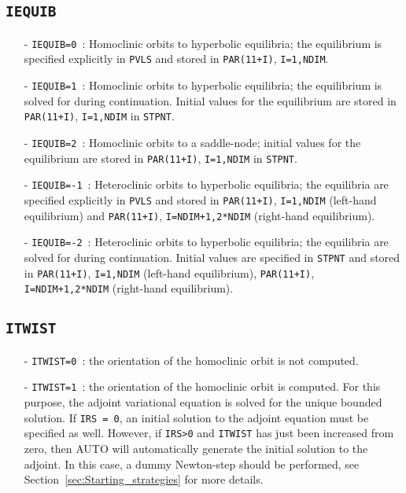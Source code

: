 \documentclass[12pt]{report}
\begin{document}
\subsection{\tt IEQUIB}  \label{sec:IEQUIB}
\begin{itemize}
\item[-] {\tt IEQUIB=0}~: 
Homoclinic orbits to hyperbolic equilibria;  
the equilibrium is specified explicitly in {\tt PVLS} and stored in
{\tt PAR(11+I)}, {\tt I=1,NDIM}.
\item[-] {\tt IEQUIB=1}~: 
Homoclinic orbits to hyperbolic equilibria;  
the equilibrium is solved for during continuation. Initial values for
the equilibrium are stored in {\tt PAR(11+I)}, {\tt I=1,NDIM} in {\tt STPNT}.
\item[-] {\tt IEQUIB=2}~: 
Homoclinic orbits to a saddle-node; initial values for
the equilibrium are stored in {\tt PAR(11+I)}, {\tt I=1,NDIM} in {\tt STPNT}.
\item[-] {\tt IEQUIB=-1}~: 
Heteroclinic orbits to hyperbolic equilibria;
the equilibria are specified explicitly in {\tt PVLS} and stored in
{\tt PAR(11+I)},  
{\tt I=1,NDIM} (left-hand equilibrium) and {\tt PAR(11+I)}, 
{\tt I=NDIM+1,2*NDIM} (right-hand equilibrium). 
\item[-] {\tt IEQUIB=-2}~: 
Heteroclinic orbits to hyperbolic equilibria;
the equilibria are solved for during continuation. Initial values are
specified in {\tt STPNT} and stored in {\tt PAR(11+I)}, {\tt I=1,NDIM} (left-hand equilibrium), 
{\tt PAR(11+I)}, {\tt I=NDIM+1,2*NDIM} (right-hand equilibrium).
\end{itemize}

\subsection{\tt ITWIST}  \label{sec:ITWIST}
\begin{itemize}
\item[-] {\tt ITWIST=0}~: 
the orientation of the homoclinic orbit is not computed.
\item[-] {\tt ITWIST=1}~: 
the orientation of the homoclinic orbit is computed. For this purpose, the
adjoint variational equation is solved for the unique bounded
solution. If {\tt IRS = 0}, an initial solution to the adjoint equation
must be specified as well. However, if {\tt IRS>0} and {\tt ITWIST} 
has just been increased from zero, then {\cal AUTO} will
automatically generate the initial solution to the adjoint. 
In this case, a dummy Newton-step should be performed, see 
Section~\ref{sec:Starting_strategies} for more details.
\end{itemize}
\end{document}
